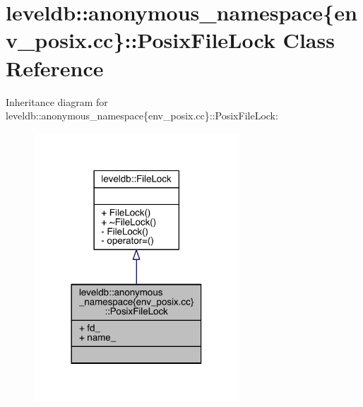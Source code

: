 \hypertarget{classleveldb_1_1anonymous__namespace_02env__posix_8cc_03_1_1_posix_file_lock}{}\section{leveldb\+:\+:anonymous\+\_\+namespace\{env\+\_\+posix.\+cc\}\+:\+:Posix\+File\+Lock Class Reference}
\label{classleveldb_1_1anonymous__namespace_02env__posix_8cc_03_1_1_posix_file_lock}


Inheritance diagram for leveldb\+:\+:anonymous\+\_\+namespace\{env\+\_\+posix.\+cc\}\+:\+:Posix\+File\+Lock\+:
\nopagebreak
\begin{figure}[H]
\begin{center}
\leavevmode
\includegraphics[width=218pt]{classleveldb_1_1anonymous__namespace_02env__posix_8cc_03_1_1_posix_file_lock__inherit__graph}
\end{center}
\end{figure}


